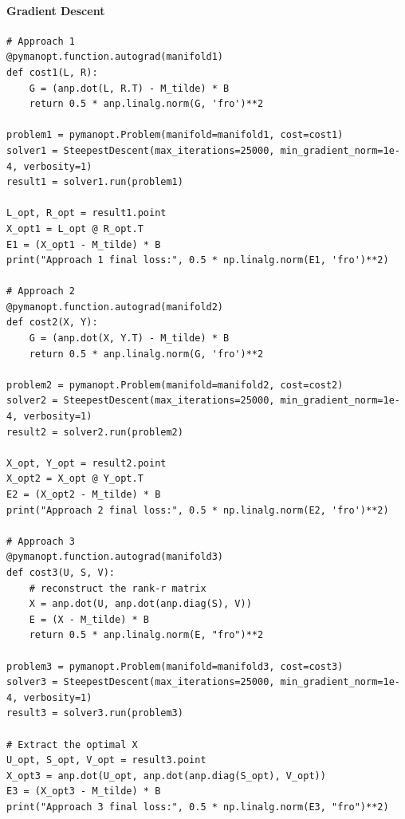 \documentclass[11pt]{scrartcl}
\begin{document}
\paragraph{Gradient Descent}

\begin{verbatim}
# Approach 1
@pymanopt.function.autograd(manifold1)
def cost1(L, R):
    G = (anp.dot(L, R.T) - M_tilde) * B
    return 0.5 * anp.linalg.norm(G, 'fro')**2

problem1 = pymanopt.Problem(manifold=manifold1, cost=cost1)
solver1 = SteepestDescent(max_iterations=25000, min_gradient_norm=1e-4, verbosity=1)
result1 = solver1.run(problem1)

L_opt, R_opt = result1.point
X_opt1 = L_opt @ R_opt.T
E1 = (X_opt1 - M_tilde) * B
print("Approach 1 final loss:", 0.5 * np.linalg.norm(E1, 'fro')**2)

# Approach 2
@pymanopt.function.autograd(manifold2)
def cost2(X, Y):
    G = (anp.dot(X, Y.T) - M_tilde) * B
    return 0.5 * anp.linalg.norm(G, 'fro')**2

problem2 = pymanopt.Problem(manifold=manifold2, cost=cost2)
solver2 = SteepestDescent(max_iterations=25000, min_gradient_norm=1e-4, verbosity=1)
result2 = solver2.run(problem2)

X_opt, Y_opt = result2.point
X_opt2 = X_opt @ Y_opt.T
E2 = (X_opt2 - M_tilde) * B
print("Approach 2 final loss:", 0.5 * np.linalg.norm(E2, 'fro')**2)

# Approach 3
@pymanopt.function.autograd(manifold3)
def cost3(U, S, V):
    # reconstruct the rank-r matrix
    X = anp.dot(U, anp.dot(anp.diag(S), V))
    E = (X - M_tilde) * B
    return 0.5 * anp.linalg.norm(E, "fro")**2

problem3 = pymanopt.Problem(manifold=manifold3, cost=cost3)
solver3 = SteepestDescent(max_iterations=25000, min_gradient_norm=1e-4, verbosity=1)
result3 = solver3.run(problem3)

# Extract the optimal X
U_opt, S_opt, V_opt = result3.point
X_opt3 = anp.dot(U_opt, anp.dot(anp.diag(S_opt), V_opt))
E3 = (X_opt3 - M_tilde) * B
print("Approach 3 final loss:", 0.5 * np.linalg.norm(E3, "fro")**2)
\end{verbatim}
\end{document}
